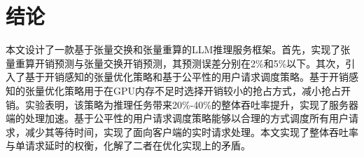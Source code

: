 \documentclass[a4paper, nosysfonts]{hpcchina}
\begin{document}
\section{结论}
本文设计了一款基于张量交换和张量重算的LLM推理服务框架。首先，实现了张量重算开销预测与张量交换开销预测，其预测误差分别在2\%和5\%以下。其次，引入了基于开销感知的张量优化策略和基于公平性的用户请求调度策略。基于开销感知的张量优化策略用于在GPU内存不足时选择开销较小的抢占方式，减小抢占开销。实验表明，该策略为推理任务带来20\%-40\%的整体吞吐率提升，实现了服务器端的处理加速。基于公平性的用户请求调度策略能够以合理的方式调度所有用户请求，减少其等待时间，实现了面向客户端的实时请求处理。本文实现了整体吞吐率与单请求延时的权衡，化解了二者在优化实现上的矛盾。
    
\end{document}
